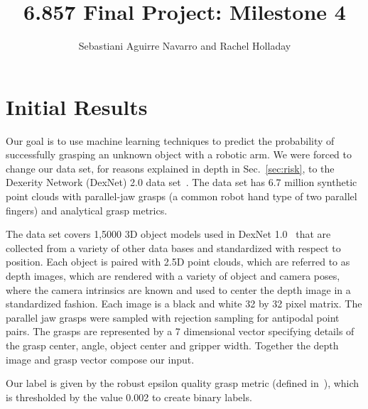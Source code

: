 \documentclass[letterpaper, 10 pt]{article}
\newcommand{\sref}[1]{Sec.~\ref{#1}} %
\begin{document}
\title{6.857 Final Project: Milestone 4}
\author{Sebastiani Aguirre Navarro and Rachel Holladay}
\maketitle

\section{Initial Results}
\label{sec:results}

Our goal is to use machine learning techniques to predict the probability of successfully grasping an unknown object with a robotic arm.
We were forced to change our data set, for reasons explained in depth in \sref{sec:risk}, to the Dexerity Network (DexNet) 2.0 data set~\cite{mahler2017dex}.
The data set has 6.7 million synthetic point clouds with parallel-jaw grasps (a common robot hand type of two parallel fingers) and analytical grasp metrics. 

The data set covers 1,5000 3D object models used in DexNet 1.0~\cite{mahler2016dex} that are collected from a variety of other data bases and standardized with respect to position. 
Each object is paired with 2.5D point clouds, which are referred to as depth images, which are rendered with a variety of object and camera poses, where the camera intrinsics are known and used to center the depth image in a standardized fashion.
Each image is a black and white 32 by 32 pixel matrix. 
The parallel jaw grasps were sampled with rejection sampling for antipodal point pairs. 
The grasps are represented by a 7 dimensional vector specifying details of the grasp center, angle, object center and gripper width. 
Together the depth image and grasp vector compose our input. 

Our label is given by the robust epsilon quality grasp metric (defined in~\cite{seita2016large}), which is thresholded by the value 0.002 to create binary labels.
\end{document}
